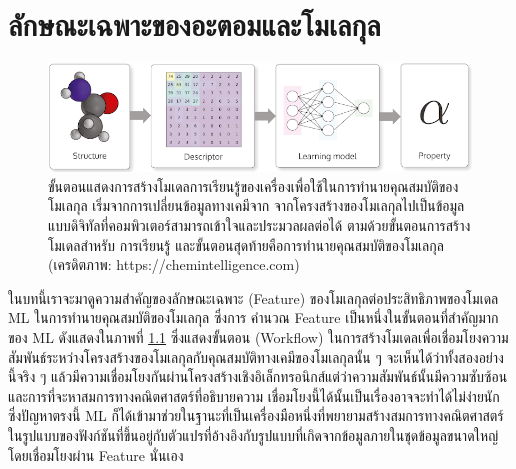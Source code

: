 

\chapter{ลักษณะเฉพาะของอะตอมและโมเลกุล}
\label{ch:feature}

\begin{figure}[htbp]
    \centering
    \includegraphics[width=\linewidth]{fig/workflow_chem_ml.png}
    \caption{ขั้นตอนแสดงการสร้างโมเดลการเรียนรู้ของเครื่องเพื่อใช้ในการทำนายคุณสมบัติของโมเลกุล เริ่มจากการเปลี่ยนข้อมูลทางเคมีจาก%
    จากโครงสร้างของโมเลกุลไปเป็นข้อมูลแบบดิจิทัลที่คอมพิวเตอร์สามารถเข้าใจและประมวลผลต่อได้ ตามด้วยขั้นตอนการสร้างโมเดลสำหรับ%
    การเรียนรู้ และขั้นตอนสุดท้ายคือการทำนายคุณสมบัติของโมเลกุล (เครดิตภาพ: https://chemintelligence.com)}
    \label{fig:workflow_chem_ml}
\end{figure}

ในบทนี้เราจะมาดูความสำคัญของลักษณะเฉพาะ (Feature) ของโมเลกุลต่อประสิทธิภาพของโมเดล ML ในการทำนายคุณสมบัติของโมเลกุล ซึ่งการ%
คำนวณ Feature เป็นหนึ่งในขั้นตอนที่สำคัญมากของ ML ดังแสดงในภาพที่ \ref{fig:workflow_chem_ml} ซึ่งแสดงขั้นตอน (Workflow) 
ในการสร้างโมเดลเพื่อเชื่อมโยงความสัมพันธ์ระหว่างโครงสร้างของโมเลกุลกับคุณสมบัติทางเคมีของโมเลกุลนั้น ๆ จะเห็นได้ว่าทั้งสองอย่างนี้จริง ๆ 
แล้วมีความเชื่อมโยงกันผ่านโครงสร้างเชิงอิเล็กทรอนิกส์แต่ว่าความสัมพันธ์นั้นมีความซับซ้อนและการที่จะหาสมการทางคณิตศาสตร์ที่อธิบายความ%
เชื่อมโยงนี้ได้นั้นเป็นเรื่องอาจจะทำได้ไม่ง่ายนัก ซึ่งปัญหาตรงนี้ ML ก็ได้เข้ามาช่วยในฐานะที่เป็นเครื่องมือหนึ่งที่พยายามสร้างสมการทางคณิตศาสตร์%
ในรูปแบบของฟังก์ชันที่ขึ้นอยู่กับตัวแปรที่อ้างอิงกับรูปแบบที่เกิดจากข้อมูลภายในชุดข้อมูลขนาดใหญ่โดยเชื่อมโยงผ่าน Feature นั่นเอง

